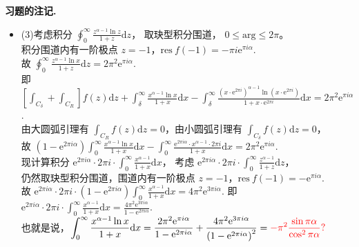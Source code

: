 \documentclass[11pt]{ctexart}
\newcounter{problemname}
\newenvironment{note}{\par\noindent\textbf{习题\arabic{problemname}的注记. }}{\par}
\begin{document}
\begin{note}
    \begin{itemize}
        \item (3)考虑积分 $\displaystyle\oint_{0}^{\infty}\frac{z^{\alpha-1}\ln{z}}{1+z}\text{d}z$，
        取玦型积分围道， $0\leq\text{arg}\leq2\pi$。 \\[12pt]
        积分围道内有一阶极点 $z = -1$，$\text{res}\ f(-1) = -\pi i\text{e}^{\pi i\alpha}$. \\[12pt]
        故 $\displaystyle\oint_{0}^{\infty}\frac{z^{\alpha-1}\ln{x}}{1+z}\text{d}z
        = 2\pi^2\text{e}^{\pi i\alpha}$. \\[12pt]
        即 $\displaystyle\left[\int_{C_\delta} + \int_{C_R}\right]f(z)\text{d}{z}
        + \int_{\delta}^{\infty}\frac{x^{\alpha-1}\ln{x}}{1+x}\text{d}x 
        - \int_{\delta}^{\infty}\frac{(x\cdot\text{e}^{2\pi i})^{\alpha-1}\ln{\left(x\cdot\text{e}^{2\pi i}\right)}}{1+x\cdot\text{e}^{2\pi i}}\text{d}x
        = 2\pi^2\text{e}^{\pi i\alpha}$. \\[12pt]
        由大圆弧引理有 $\displaystyle\int_{C_R}f(z)\text{d}z = 0$，由小圆弧引理有 $\displaystyle\int_{C_\delta}f(z)\text{d}z = 0$， \\[12pt]
        故 $\displaystyle\left(1-\text{e}^{2\pi i\alpha}\right)\int_{0}^{\infty}\frac{x^{\alpha-1}\ln{x}}{1+x}\text{d}x 
        - \int_{0}^{\infty}\frac{\text{e}^{2\pi i\alpha}\cdot x^{\alpha-1}\cdot 2\pi i}{1+x}\text{d}x
        = 2\pi^2\text{e}^{\pi i\alpha}$. \\[12pt]
        现计算积分 $\displaystyle \text{e}^{2\pi i\alpha}\cdot2\pi i\cdot\int_{0}^{\infty}\frac{x^{\alpha-1}}{1+x}\text{d}x$， 
        考虑 $\displaystyle \text{e}^{2\pi i\alpha}\cdot2\pi i\cdot\int_{0}^{\infty}\frac{z^{\alpha-1}}{1+z}\text{d}z$， \\[12pt]
        仍然取玦型积分围道，围道内有一阶极点 $z = -1$，$\text{res}\ f(-1) = -\text{e}^{\pi i\alpha}$. \\[12pt]
        故 $\displaystyle \text{e}^{2\pi i\alpha}\cdot2\pi i\cdot\left(1-\text{e}^{2\pi i\alpha}\right)\int_{0}^{\infty}\frac{x^{\alpha-1}}{1+x}\text{d}x
        = 4\pi^2\text{e}^{3\pi i\alpha}$. 
        即 $\displaystyle \text{e}^{2\pi i\alpha}\cdot2\pi i\cdot\int_{0}^{\infty}\frac{x^{\alpha-1}}{1+x}\text{d}x
        = \frac{4\pi^2\text{e}^{3\pi i\alpha}}{1-\text{e}^{2\pi i\alpha}}$. \\[12pt]
        也就是说，$\displaystyle\int_{0}^{\infty}\frac{x^{\alpha-1}\ln{x}}{1+x}\text{d}x
        = \frac{2\pi^2\text{e}^{\pi i\alpha}}{1-\text{e}^{2\pi i\alpha}}
        + \frac{4\pi^2\text{e}^{3\pi i\alpha}}{\left(1-\text{e}^{2\pi i\alpha}\right)^2}
        = \textcolor{red}{-\pi^2\frac{\sin{\pi\alpha}}{\cos^2{\pi\alpha}}?}$
    \end{itemize}
\end{note}
\end{document}

